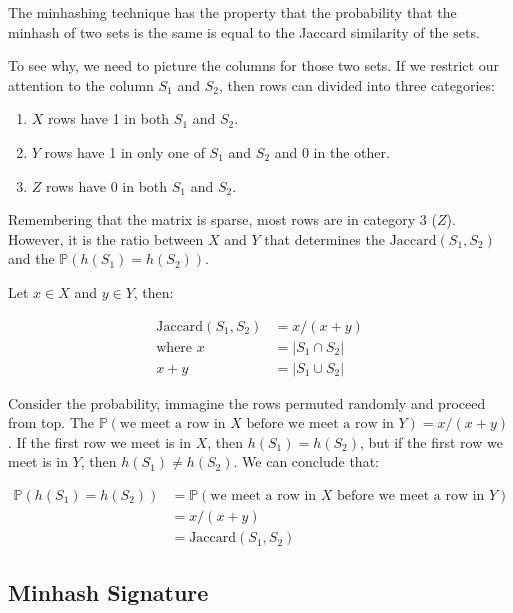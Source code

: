 The minhashing technique has the property that the probability that the minhash of two sets is the same is equal to the Jaccard similarity of the sets.

To see why, we need to picture the columns for those two sets. If we restrict our attention to the column $S_1$ and $S_2$, then rows can divided into three categories:

\begin{enumerate}
    \item $X$ rows have 1 in both $S_1$ and $S_2$. 
    \item $Y$ rows have 1 in only one of $S_1$ and $S_2$ and 0 in the other.
    \item $Z$ rows have 0 in both $S_1$ and $S_2$.
\end{enumerate}

Remembering that the matrix is sparse, most rows are in category 3 ($Z$). However, it is the ratio between $X$ and $Y$ that determines the $\text{Jaccard}(S_1, S_2)$ and the $\mathbb{P}(h(S_1) = h(S_2))$.

Let $x \in X$ and $y \in Y$, then:

\begin{equation*}
    \begin{split}
        \text{Jaccard}(S_1, S_2) &= x / (x + y)\\
        \text{where } x &= |S_1 \cap S_2|\\
        x + y & = |S_1 \cup S_2|
    \end{split}
\end{equation*}

Consider the probability, immagine the rows permuted randomly and proceed from top. The $\mathbb{P}(\text{we meet a row in } X \text{ before we meet a row in } Y) = x / (x + y)$. If the first row we meet is in $X$, then $h(S_1) = h(S_2)$, but if the first row we meet is in $Y$, then $h(S_1) \neq h(S_2)$. We can conclude that:

\begin{equation*}
    \begin{split}
        \mathbb{P}(h(S_1) = h(S_2)) &= \mathbb{P}(\text{we meet a row in } X \text{ before we meet a row in } Y)\\
        &= x / (x + y)\\
        &= \text{Jaccard}(S_1, S_2)
    \end{split}
\end{equation*}

\subsection{Minhash Signature}\label{subsec:minhash-signature}

